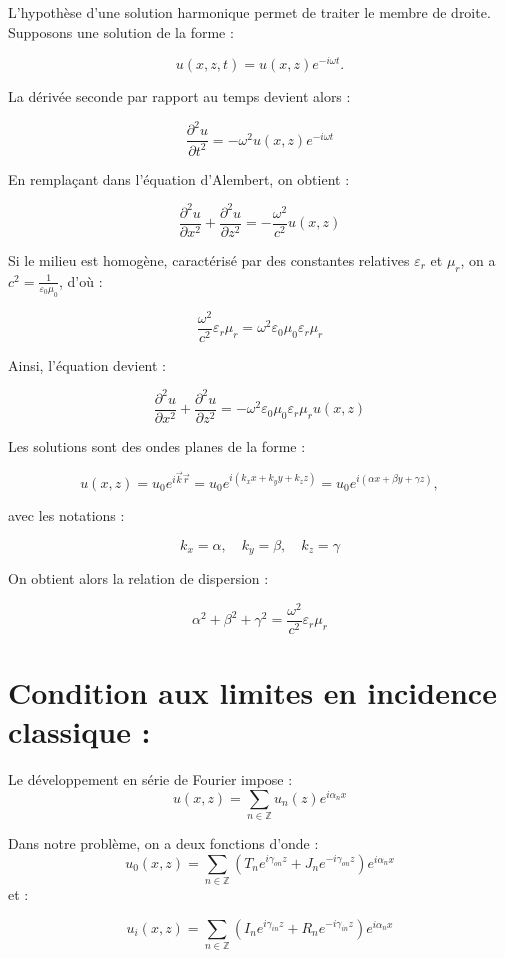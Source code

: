 \documentclass{article}
\begin{document}
L'hypothèse d'une solution harmonique permet de traiter le membre de droite. Supposons une solution de la forme :

\[
u(x, z, t) = u(x, z)  e^{-i \omega t}.
\]

La dérivée seconde par rapport au temps devient alors :

\[
\frac{\partial^2 u}{\partial t^2} = -\omega^2 u(x, z)  e^{-i \omega t}
\]

En remplaçant dans l’équation d’Alembert, on obtient :

\[
\frac{\partial^2 u}{\partial x^2} + \frac{\partial^2 u}{\partial z^2} = -\frac{\omega^2}{c^2} u(x, z)
\]

Si le milieu est homogène, caractérisé par des constantes relatives \( \varepsilon_r \) et \( \mu_r \), on a \( c^2 = \frac{1}{\varepsilon_0 \mu_0} \), d’où :

\[
\frac{\omega^2}{c^2} \varepsilon_r \mu_r = \omega^2 \varepsilon_0 \mu_0 \varepsilon_r \mu_r
\]

Ainsi, l'équation devient :

\[
\frac{\partial^2 u}{\partial x^2} + \frac{\partial^2 u}{\partial z^2} = -\omega^2 \varepsilon_0 \mu_0 \varepsilon_r \mu_r  u(x, z)
\]

Les solutions sont des ondes planes de la forme :

\[
u(x, z) = u_0 e^{i \vec{k}  \vec{r}} = u_0 e^{i(k_x x + k_y y + k_z z)} = u_0 e^{i(\alpha x + \beta y + \gamma z)},
\]

avec les notations :

\[
k_x = \alpha, \quad k_y = \beta, \quad k_z = \gamma
\]

On obtient alors la relation de dispersion :

\[
\alpha^2 + \beta^2 + \gamma^2 = \frac{\omega^2}{c^2} \varepsilon_r \mu_r
\]

\section*{Condition aux limites en incidence classique :}

Le développement en série de Fourier impose :
\[
u(x, z) = \sum_{n \in \mathbb{Z}} u_n(z) e^{i \alpha_n x}
\]

Dans notre problème, on a deux fonctions d'onde :
\[
u_0(x, z) = \sum_{n \in \mathbb{Z}} \left( T_n e^{i \gamma_{on} z} + J_n e^{-i \gamma_{on} z} \right) e^{i \alpha_n x}
\]
et :

\[
u_i(x, z) = \sum_{n \in \mathbb{Z}} \left( I_n e^{i \gamma_{in} z} + R_n e^{-i \gamma_{in} z} \right) e^{i \alpha_n x}
\]
\end{document}
